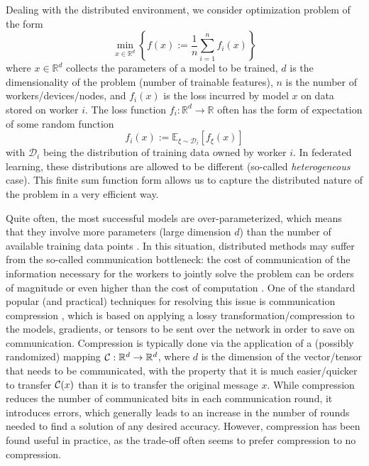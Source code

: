 \documentclass[nohyperref]{article}
\theoremstyle{plain}
\theoremstyle{definition}
\theoremstyle{remark}
\begin{document}
Dealing with the distributed environment, we consider optimization problem of the form
\begin{equation}\label{eq:finit_sum}
\min _{x \in \mathbb{R}^{d}}\left\{f(x):=\frac{1}{n} \sum_{i=1}^{n} f_{i}(x)\right\}
\end{equation}
where $x \in \mathbb{R}^{d}$ collects the parameters of a model to be trained, $d$ is the dimensionality of the problem (number of trainable features), $n$ is the number of workers/devices/nodes, and $f_{i}(x)$ is the loss incurred by model $x$ on data stored on worker $i$. The loss function $f_{i}: \mathbb{R}^{d} \rightarrow \mathbb{R}$ often has the form of expectation of some random function
$$
f_{i}(x):=\mathbb{E}_{\xi \sim \mathcal{D}_{i}}\left[f_{\xi}(x)\right]
$$
with $\mathcal{D}_{i}$ being the distribution of training data owned by worker $i$. 
In federated learning, these distributions are allowed to be different (so-called \emph {heterogeneous} case).
This finite sum function form allows us to capture the distributed nature of the problem in a very efficient way.

Quite often, the most successful models are over-parameterized, which means that they involve more parameters (large dimension $d$) than the number of available training data points \cite{ACH-overparameterized-2018}. 
In this situation, distributed methods may suffer from the so-called communication bottleneck: the cost of communication of the information necessary for the workers to jointly solve the problem can be orders of magnitude or even higher than the cost of computation \cite{dutta2020discrepancy}.
One of the standard popular (and practical)  techniques for resolving this issue is communication compression \cite{seide20141, suresh2017distributed, konevcny2018randomized}, which is based on applying a lossy transformation/compression to the models, gradients, or tensors to be sent over the network in order to save on communication.
Compression is typically done via the application of a (possibly randomized) mapping $\mathcal{C}: \mathbb R^d \rightarrow \mathbb R^d$, where $d$ is the dimension of the vector/tensor that needs to be communicated, with the property that it is much easier/quicker to transfer $\mathcal{C}(x)$ than it is to transfer the original message $x$.
While compression reduces the number of communicated bits in each communication round, it introduces errors, which generally leads to an increase in the number of rounds needed to find a solution of any desired accuracy. However, compression has been found useful in practice, as the trade-off often seems to prefer compression to no compression. 
\end{document}

